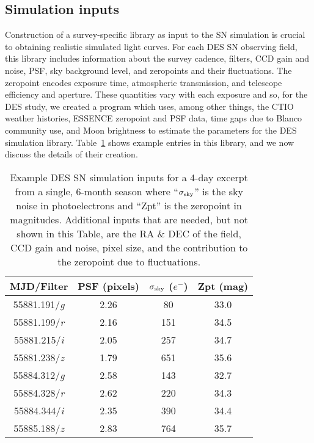 \documentclass[preprint2]{aastex}    %
\begin{document}
\subsection{Simulation inputs}\label{sec:siminputs}
Construction of a survey-specific library as input to the 
SN simulation is crucial to obtaining realistic simulated light curves. For each DES SN observing field, this library 
includes information about the survey cadence, filters, CCD gain and noise, PSF, sky background level, and zeropoints and their fluctuations. The zeropoint encodes exposure time, atmospheric 
transmission, and telescope efficiency and aperture. These quantities vary with each exposure and so, 
for the DES study, we created a program which uses, among other things, the CTIO weather histories, 
ESSENCE zeropoint and PSF data, time gaps due to Blanco community use, and Moon brightness 
to estimate the parameters for the DES simulation library. Table~\ref{tab:simlib} shows 
example entries in this library, and we now discuss the details of their creation.

\begin{table}[!ht]
\begin{center}
\small
\begin{tabular}{cccc}
\hline
MJD/Filter & PSF (pixels) & $\sigma_{{\rm sky}}$ ($e^{-}$) & Zpt (mag)\\\hline
55881.191/\textit{g} & 2.26 & 80 & 33.0\\
55881.199/\textit{r} & 2.16 & 151 & 34.5\\
55881.215/\textit{i} & 2.05 & 257 & 34.7\\
55881.238/\textit{z} & 1.79 & 651 & 35.6\\
55884.312/\textit{g} & 2.58 & 143 & 32.7\\
55884.328/\textit{r} & 2.62 & 220 & 34.3\\
55884.344/\textit{i} & 2.35 & 390 & 34.4\\
55885.188/\textit{z} & 2.83 & 764 & 35.7\\
\hline
\end{tabular}
\caption{Example DES SN simulation inputs for a 4-day excerpt from a single, 6-month season where ``$\sigma_{{\rm sky}}$'' is the 
sky noise in photoelectrons and ``Zpt'' is the zeropoint in magnitudes. Additional 
inputs that are needed, but not shown in this Table, are the RA \& DEC of the field, 
CCD gain and noise, pixel size, and the contribution to the zeropoint 
due to fluctuations.\label{tab:simlib}}
\end{center}
\end{table}
\normalsize
\end{document}

